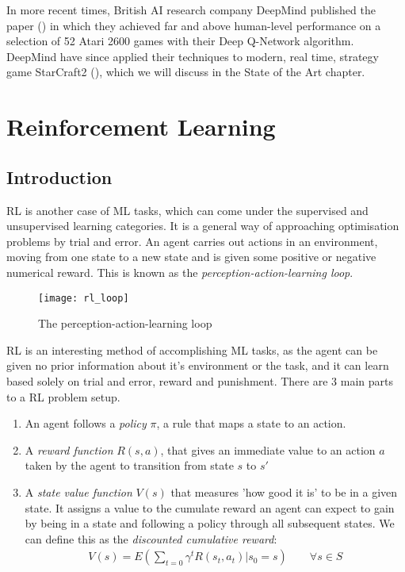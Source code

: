 In more recent times, British AI research company DeepMind published the paper (\citet{deepmind1}) in which they achieved far and above
human-level performance on a selection of 52 Atari 2600 games with their Deep Q-Network algorithm.
DeepMind have since applied their techniques to modern, real time, strategy game StarCraft2
(\citet{starcraft}), which we will discuss in the State of the Art chapter. 

\section{Reinforcement Learning}
\subsection{Introduction}
RL is another case of ML tasks, which can come under the supervised and unsupervised learning
categories. It is a general way of approaching optimisation problems by trial and error. An agent
carries out actions in an environment, moving from one state to a new state and is given some
positive or negative numerical reward. This is known as the \textit{perception-action-learning
    loop}.

\begin{figure}[h]
    \texttt{[image: rl\_loop]}
    \centering
    \caption{The perception-action-learning loop}
\end{figure}

RL is an interesting method of accomplishing ML tasks, as the agent can be given no prior
information about it's environment or the task, and it can learn based solely on trial and error,
reward and punishment. There are 3 main parts to a RL problem setup.

\begin{enumerate}
    \item An agent follows a \textit{policy} $\pi$, a rule that maps a state to an action.
    \item A \textit{reward function} $R(s, a)$, that gives an immediate value to an action $a$ taken
          by the agent to transition from state $s$ to $s'$
    \item A \textit{state value function} $V(s)$ that measures 'how good it is' to be in a given
          state. It assigns a value to the cumulate reward an agent can expect to gain by being in a
          state and following a policy through all subsequent states. We can define this as the
          \textit{discounted cumulative reward}:
          \begin{align}
              V(s) = E(\sum_{t=0}\gamma^tR(s_t, a_t) | s_0 = s) \qquad \forall s \in S
          \end{align}
\end{enumerate}

